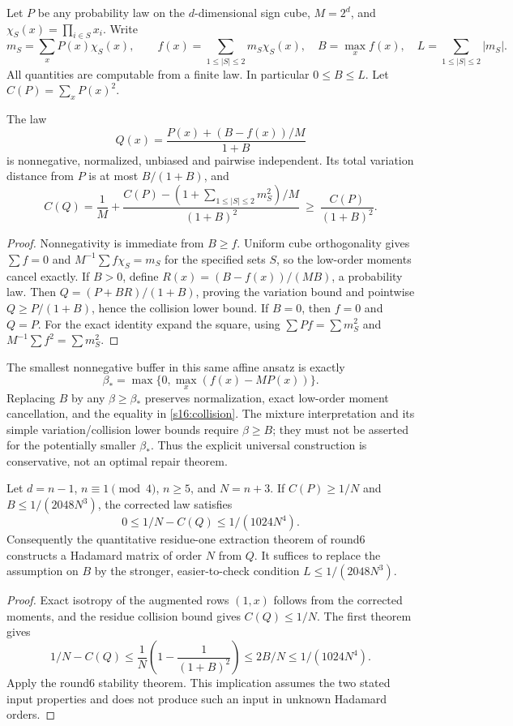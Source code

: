 
Let $P$ be any probability law on the $d$-dimensional sign cube,
$M=2^d$, and $\chi_S(x)=\prod_{i\in S}x_i$. Write
\[
 m_S=\sum_xP(x)\chi_S(x),\qquad
 f(x)=\sum_{1\le|S|\le2}m_S\chi_S(x),\quad
 B=\max_x f(x),\quad L=\sum_{1\le|S|\le2}|m_S|.
\]
All quantities are computable from a finite law. In particular
$0\le B\le L$. Let $C(P)=\sum_xP(x)^2$.

\begin{theorem}
The law
\[
 Q(x)=\frac{P(x)+(B-f(x))/M}{1+B}
\]
is nonnegative, normalized, unbiased and pairwise independent. Its
total variation distance from $P$ is at most $B/(1+B)$, and
\begin{equation}\label{s16:collision}
 C(Q)=\frac1M+
 \frac{C(P)-(1+\sum_{1\le|S|\le2}m_S^2)/M}{(1+B)^2}
 \ \ge\ \frac{C(P)}{(1+B)^2}.
\end{equation}
\end{theorem}
\begin{proof}
Nonnegativity is immediate from $B\ge f$. Uniform cube orthogonality
gives $\sum f=0$ and $M^{-1}\sum f\chi_S=m_S$ for the specified
sets $S$, so the low-order moments cancel exactly. If $B>0$, define
$R(x)=(B-f(x))/(MB)$, a probability law. Then
$Q=(P+BR)/(1+B)$, proving the variation bound and pointwise
$Q\ge P/(1+B)$, hence the collision lower bound. If $B=0$, then
$f=0$ and $Q=P$. For the exact identity expand the square, using
$\sum P f=\sum m_S^2$ and $M^{-1}\sum f^2=\sum m_S^2$.
\end{proof}

The smallest nonnegative buffer in this same affine ansatz is exactly
\[
 \beta_* =\max\{0,\max_x(f(x)-MP(x))\}.
\]
Replacing $B$ by any $\beta\ge\beta_*$ preserves normalization,
exact low-order moment cancellation, and the equality in
\eqref{s16:collision}. The mixture interpretation and its simple
variation/collision lower bounds require $\beta\ge B$; they must not
be asserted for the potentially smaller $\beta_*$. Thus the explicit
universal construction is conservative, not an optimal repair theorem.

\begin{theorem}
Let $d=n-1$, $n\equiv1\pmod4$, $n\ge5$, and $N=n+3$.
If $C(P)\ge1/N$ and $B\le1/(2048N^3)$, the corrected law satisfies
\[
 0\le1/N-C(Q)\le1/(1024N^4).
\]
Consequently the quantitative residue-one extraction theorem of round6
constructs a Hadamard matrix of order $N$ from $Q$.
It suffices to replace the assumption on $B$ by the stronger,
easier-to-check condition $L\le1/(2048N^3)$.
\end{theorem}
\begin{proof}
Exact isotropy of the augmented rows $(1,x)$ follows from the
corrected moments, and the residue collision bound gives $C(Q)\le1/N$.
The first theorem gives
\[
 1/N-C(Q)\le\frac1N\left(1-\frac1{(1+B)^2}\right)
 \le 2B/N\le1/(1024N^4).
\]
Apply the round6 stability theorem. This implication assumes the two
stated input properties and does not produce such an input in unknown
Hadamard orders.
\end{proof}

